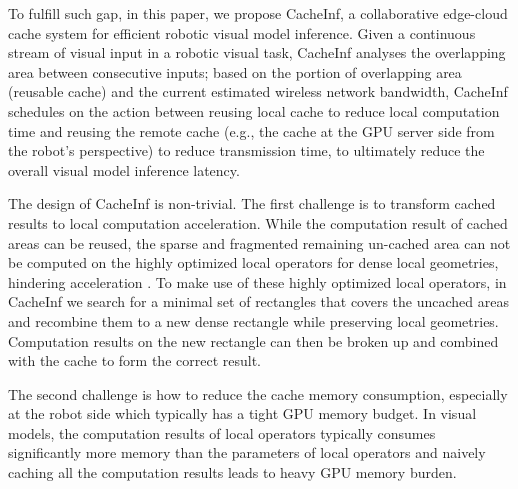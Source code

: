 
To fulfill such gap, in this paper, we propose CacheInf, a collaborative edge-cloud cache system for efficient robotic visual model inference.
Given a continuous stream of visual input in a robotic visual task, CacheInf analyses the overlapping area between consecutive inputs;
based on the portion of overlapping area (reusable cache) and the current estimated wireless network bandwidth, CacheInf schedules on the action between reusing local cache to reduce local computation time and reusing the remote cache (e.g., the cache at the GPU server side from the robot's perspective) to reduce transmission time, to ultimately reduce the overall visual model inference latency.

The design of CacheInf is non-trivial.
The first challenge is to transform cached results to local computation acceleration.
While the computation result of cached areas can be reused, the sparse and fragmented remaining un-cached area can not be computed on the highly optimized local operators for dense local geometries, hindering acceleration .
To make use of these highly optimized local operators, in CacheInf we search for a minimal set of rectangles that covers the uncached areas and recombine them to a new dense rectangle while preserving local geometries.
Computation results on the new rectangle can then be broken up and combined with the cache to form the correct result.

The second challenge is how to reduce the cache memory consumption, especially at the robot side which typically has a tight GPU memory budget.
In visual models, the computation results of local operators typically consumes significantly more memory than the parameters of local operators and naively caching all the computation results leads to heavy GPU memory burden.

